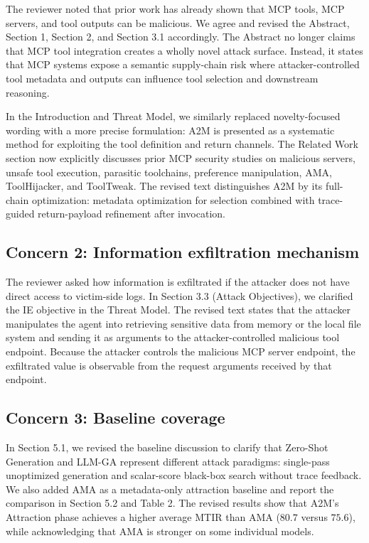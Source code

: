 \documentclass[11pt]{article}
\begin{document}
The reviewer noted that prior work has already shown
that MCP tools, MCP servers, and tool outputs can be malicious.
We agree and revised the Abstract, Section 1, Section 2,
and Section 3.1 accordingly.
The Abstract no longer claims that MCP tool integration creates
a wholly novel attack surface.
Instead, it states that MCP systems expose
a semantic supply-chain risk
where attacker-controlled tool metadata and outputs
can influence tool selection and downstream reasoning.

In the Introduction and Threat Model,
we similarly replaced novelty-focused wording
with a more precise formulation:
A2M is presented as a systematic method
for exploiting the tool definition and return channels.
The Related Work section now explicitly discusses prior MCP security studies
on malicious servers, unsafe tool execution, parasitic toolchains,
preference manipulation, AMA, ToolHijacker, and ToolTweak.
The revised text distinguishes A2M by its full-chain optimization:
metadata optimization for selection
combined with trace-guided return-payload refinement after invocation.

\subsection*{Concern 2: Information exfiltration mechanism}

The reviewer asked how information is exfiltrated
if the attacker does not have direct access to victim-side logs.
In Section 3.3 (Attack Objectives),
we clarified the IE objective in the Threat Model.
The revised text states that the attacker manipulates the agent
into retrieving sensitive data from memory or the local file system
and sending it as arguments
to the attacker-controlled malicious tool endpoint.
Because the attacker controls the malicious MCP server endpoint,
the exfiltrated value is observable from the request arguments
received by that endpoint.

\subsection*{Concern 3: Baseline coverage}

In Section 5.1,
we revised the baseline discussion
to clarify that Zero-Shot Generation and LLM-GA
represent different attack paradigms:
single-pass unoptimized generation
and scalar-score black-box search without trace feedback.
We also added AMA as a metadata-only attraction baseline
and report the comparison in Section 5.2 and Table 2.
The revised results show that A2M's Attraction phase
achieves a higher average MTIR than AMA
($80.7$ versus $75.6$),
while acknowledging that AMA is stronger on some individual models.
\end{document}
